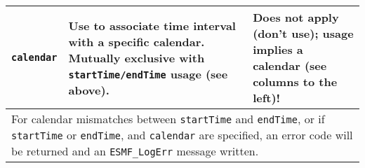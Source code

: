 \begin{center}
\begin{table}
\begin{tabular}{|p{1.5in}|p{1.25in}|p{1.25in}|p{1.25in}|p{1.25in}|p{1.25in}|}
{\bf {\tt calendar}} &
  \multicolumn{4}{l}{Use to associate time interval with a specific calendar.  Mutually exclusive with {\tt startTime/endTime} usage (see above).} &

  Does not apply (don't use); usage implies a calendar (see columns to the left)! \\
\hline

  \multicolumn{6}{l}{For calendar mismatches between {\tt startTime} and {\tt endTime}, or if {\tt startTime} or {\tt endTime}, and {\tt calendar} are specified, an error code will be returned and an {\tt ESMF\_LogErr} message written.} \\
\hline

\end{tabular}
\end{table}
\end{center}
